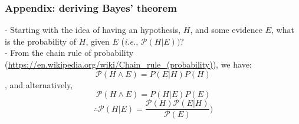 \documentclass[•]{beamer}
\begin{document}
	\begin{frame}
		\frametitle{Appendix: deriving Bayes' theorem}
		- Starting with the idea of having an hypothesis, $H$, and some evidence $E$, what is the probability of $H$, given $E$ (\textit{i.e.}, $\mathcal{P}(H | E))$?\\
		- From the chain rule of probability (\url{https://en.wikipedia.org/wiki/Chain_rule_(probability)}), we have: $$\mathcal{P}(H \land E) = P(E | H) P(H)$$, and alternatively, $$\mathcal{P}(H \land E) = P(H | E) P(E)$$
		$$\therefore \mathcal{P}(H | E) = \frac{\mathcal{P}(H) \mathcal{P}(E | H)}{\mathcal{P}(E)})$$
	\end{frame}
\end{document}
